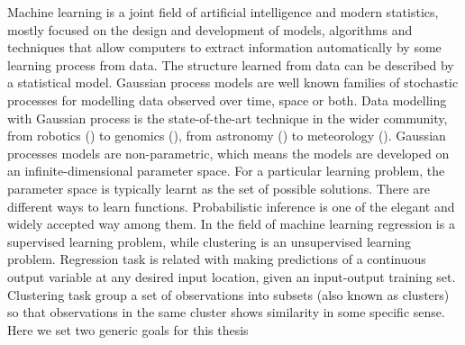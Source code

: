 \documentclass[a4paper,10pt]{article}
\begin{document}
Machine learning is a joint field of artificial intelligence and modern statistics, mostly focused on the design and development of models, algorithms and techniques that allow computers to extract information automatically by some learning process from data. The structure learned from data can be described by a statistical model. Gaussian process models are well known families of stochastic processes for modelling data observed over time, space or both. Data modelling with Gaussian process is the state-of-the-art technique in the wider community, from robotics (\cite{Deisenroth:2014}) to genomics (\cite{Topa:2015}), from astronomy (\cite{Rajpaul:2015}) to  meteorology (\cite{Chen:2014}).  Gaussian processes models are non-parametric, which means the models are developed on an infinite-dimensional parameter space. For a particular learning problem, the parameter space is typically learnt as the set of possible solutions. There are different ways to learn functions. Probabilistic inference is one of the elegant and widely accepted way among them. In the field of machine learning regression is a supervised learning problem, while clustering is an unsupervised learning problem. Regression task is related with making predictions of a continuous output variable at any desired input location, given an input-output training set. Clustering task group a set of observations into subsets (also known as clusters) so that observations in the same cluster shows similarity in some specific sense. Here we set two generic goals for this thesis
\end{document}
